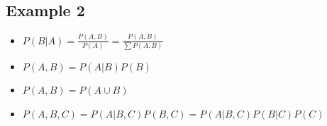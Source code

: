 \documentclass[12pt,a4paper]{article}
\begin{document}
\subsection{Example 2}
\begin{itemize}
\item $P(B|A)=\frac{P(A,B)}{P(A)}=\frac{P(A,B)}{\sum P(A,B)}$
\item $P(A,B)=P(A|B)P(B)$
\item $P(A,B)=P(A\cup B)$
\item $P(A,B,C) = P(A|B,C)P(B,C)=P(A|B,C)P(B|C)P(C)$
\end{itemize}
\end{document}
